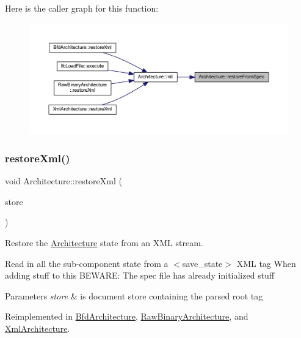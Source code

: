 Here is the caller graph for this function\+:
\nopagebreak
\begin{figure}[H]
\begin{center}
\leavevmode
\includegraphics[width=350pt]{class_architecture_aed18df408eb73d0735966c68b44e413b_icgraph}
\end{center}
\end{figure}
\mbox{\label{class_architecture_ab15a398b9f84dd62ad36d1e83895783a}} 
\subsubsection{\texorpdfstring{restoreXml()}{restoreXml()}}
{\footnotesize\ttfamily void Architecture\+::restore\+Xml (\begin{DoxyParamCaption}\item[{\mbox{\hyperlink{class_document_storage}{Document\+Storage}} \&}]{store }\end{DoxyParamCaption})\hspace{0.3cm}{\ttfamily [virtual]}}



Restore the \mbox{\hyperlink{class_architecture}{Architecture}} state from an X\+ML stream. 

Read in all the sub-\/component state from a $<$save\+\_\+state$>$ X\+ML tag When adding stuff to this B\+E\+W\+A\+RE\+: The spec file has already initialized stuff 
\begin{DoxyParams}{Parameters}
{\em store} & is document store containing the parsed root tag \\
\hline
\end{DoxyParams}


Reimplemented in \mbox{\hyperlink{class_bfd_architecture_a577d1f082486f2cd6f134d1ce5eb3989}{Bfd\+Architecture}}, \mbox{\hyperlink{class_raw_binary_architecture_a381c8c1c048d0c8a17322ef8a17ae6ea}{Raw\+Binary\+Architecture}}, and \mbox{\hyperlink{class_xml_architecture_aead4d5224e18ab98cd30ca89774b9faa}{Xml\+Architecture}}.




